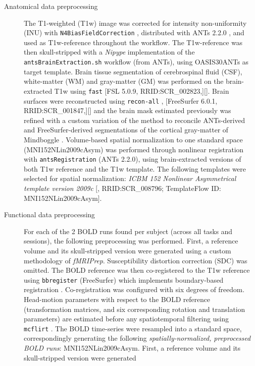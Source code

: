 \documentclass[10pt,letterpaper]{article}
\begin{document}
\begin{description}
\item[Anatomical data preprocessing]
The T1-weighted (T1w) image was corrected for intensity non-uniformity
(INU) with \texttt{N4BiasFieldCorrection} \cite{n4}, distributed with
ANTs 2.2.0 \cite[RRID:SCR\_004757]{ants}, and used as T1w-reference
throughout the workflow.
The T1w-reference was then skull-stripped with a \emph{Nipype} implementation
of the \texttt{antsBrainExtraction.sh} workflow (from ANTs), using OASIS30ANTs
as target template.
Brain tissue segmentation of cerebrospinal fluid (CSF), white-matter (WM) and
gray-matter (GM) was performed on the brain-extracted T1w using
\texttt{fast} \cite{fsl_fast} [FSL 5.0.9, RRID:SCR\_002823,][].
Brain surfaces were reconstructed using \texttt{recon-all} \cite{fs_reconall},
[FreeSurfer 6.0.1, RRID:SCR\_001847,][] and the brain mask estimated
previously was refined with a custom variation of the method to
reconcile ANTs-derived and FreeSurfer-derived segmentations of the
cortical gray-matter of Mindboggle \cite[RRID:SCR\_002438,]{mindboggle}.
Volume-based spatial normalization to one standard space (MNI152NLin2009cAsym)
was performed through nonlinear registration with \texttt{antsRegistration}
(ANTs 2.2.0), using brain-extracted versions of both T1w reference and the T1w template.
The following templates were selected for spatial normalization: \emph{ICBM 152 Nonlinear
Asymmetrical template version 2009c} {[}\cite{mni152nlin2009casym},
RRID:SCR\_008796; TemplateFlow ID: MNI152NLin2009cAsym{]}.
\item[Functional data preprocessing]
For each of the 2 BOLD runs found per subject (across all tasks and
sessions), the following preprocessing was performed. First, a reference
volume and its skull-stripped version were generated using a custom
methodology of \emph{fMRIPrep}.
Susceptibility distortion correction (SDC) was omitted.
The BOLD reference was then co-registered to the T1w reference using \texttt{bbregister}
(FreeSurfer) which implements boundary-based registration \cite{bbr}.
Co-registration was configured with six degrees of freedom.
Head-motion parameters with respect to the BOLD reference (transformation matrices,
and six corresponding rotation and translation parameters) are estimated before any
spatiotemporal filtering using \texttt{mcflirt} \cite[FSL 5.0.9,]{mcflirt}.
The BOLD time-series were resampled into a standard space, correspondingly
generating the following \emph{spatially-normalized, preprocessed BOLD runs}:
MNI152NLin2009cAsym.
First, a reference volume and its skull-stripped version were generated 

\end{description}
\end{document}
